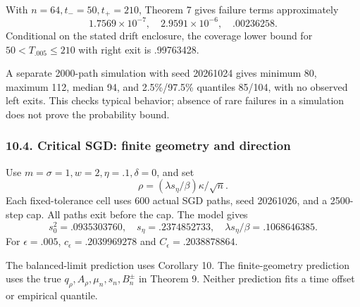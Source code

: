 With \(n=64,t_-=50,t_+=210\), Theorem 7 gives failure terms
approximately \[
1.7569\times10^{-7},\quad2.9591\times10^{-6},\quad.00236258.
\] Conditional on the stated drift enclosure, the coverage lower bound
for \(50<T_{.005}\le210\) with right exit is .99763428.

A separate 2000-path simulation with seed 20261024 gives minimum 80,
maximum 112, median 94, and 2.5\%/97.5\% quantiles 85/104, with no
observed left exits. This checks typical behavior; absence of rare
failures in a simulation does not prove the probability bound.

\subsubsection{10.4. Critical SGD: finite geometry and
direction}\label{experiments-critical-sgd-finite-geometry-and-direction}

Use \(m=\sigma=1,w=2,\eta=.1,\delta=0\), and set \[
\rho=(\lambda s_\eta/\beta)\kappa/\sqrt n.
\] Each fixed-tolerance cell uses 600 actual SGD paths, seed 20261026,
and a 2500-step cap. All paths exit before the cap. The model gives \[
s_0^2=.0935303760,\quad s_\eta=.2374852733,\quad
\lambda s_\eta/\beta=.1068646385.
\] For \(\epsilon=.005\), \(c_\epsilon=.2039969278\) and
\(C_\epsilon=.2038878864\).

The balanced-limit prediction uses Corollary 10. The finite-geometry
prediction uses the true \(q_\rho,A_\rho,\mu_n,s_n,B_n^\pm\) in Theorem
9. Neither prediction fits a time offset or empirical quantile.

